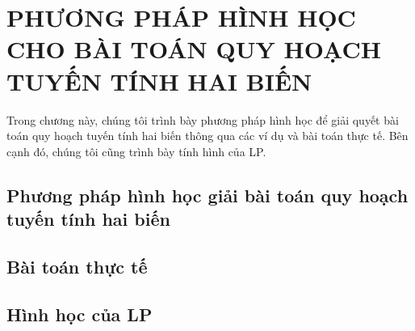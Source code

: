 \chapter{PHƯƠNG PHÁP HÌNH HỌC CHO BÀI TOÁN QUY HOẠCH TUYẾN TÍNH HAI BIẾN}

Trong chương này, chúng tôi trình bày phương pháp hình học để giải quyết bài toán quy hoạch tuyến tính hai biến thông qua các ví dụ và bài toán thực tế. Bên cạnh đó, chúng tôi cũng trình bày tính hình của LP.

\section{Phương pháp hình học giải bài toán quy hoạch tuyến tính hai biến}


\section{Bài toán thực tế}


\section{Hình học của LP}